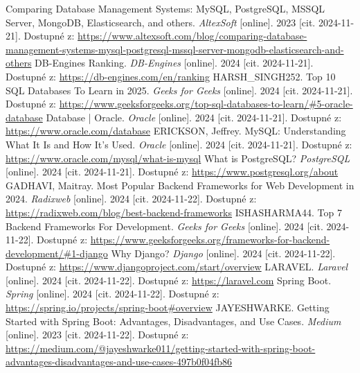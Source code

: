 \documentclass[twoside]{ctuthesis}
\begin{document}
\begin{thebibliography}{1}
Comparing Database Management Systems: MySQL, PostgreSQL, MSSQL Server, MongoDB, Elasticsearch, and others. \emph{AltexSoft} [online]. 2023 [cit. 2024-11-21]. Dostupné z: \url{https://www.altexsoft.com/blog/comparing-database-management-systems-mysql-postgresql-mssql-server-mongodb-elasticsearch-and-others}
DB-Engines Ranking. \emph{DB-Engines} [online]. 2024 [cit. 2024-11-21]. Dostupné z: \url{https://db-engines.com/en/ranking}
HARSH\_SINGH252. Top 10 SQL Databases To Learn in 2025. \emph{Geeks for Geeks} [online]. 2024 [cit. 2024-11-21]. Dostupné z: \url{https://www.geeksforgeeks.org/top-sql-databases-to-learn/\#5-oracle-database}
Database | Oracle. \emph{Oracle} [online]. 2024 [cit. 2024-11-21]. Dostupné z: \url{https://www.oracle.com/database}
ERICKSON, Jeffrey. MySQL: Understanding What It Is and How It’s Used. \emph{Oracle} [online]. 2024 [cit. 2024-11-21]. Dostupné z: \url{https://www.oracle.com/mysql/what-is-mysql}
What is PostgreSQL? \emph{PostgreSQL} [online]. 2024 [cit. 2024-11-21]. Dostupné z: \url{https://www.postgresql.org/about}
GADHAVI, Maitray. Most Popular Backend Frameworks for Web Development in 2024. \emph{Radixweb} [online]. 2024 [cit. 2024-11-22]. Dostupné z: \url{https://radixweb.com/blog/best-backend-frameworks}
ISHASHARMA44. Top 7 Backend Frameworks For Development. \emph{Geeks for Geeks} [online]. 2024 [cit. 2024-11-22]. Dostupné z: \url{https://www.geeksforgeeks.org/frameworks-for-backend-development/\#1-django}
Why Django? \emph{Django} [online]. 2024 [cit. 2024-11-22]. Dostupné z: \url{https://www.djangoproject.com/start/overview}
LARAVEL. \emph{Laravel} [online]. 2024 [cit. 2024-11-22]. Dostupné z: \url{https://laravel.com}
Spring Boot. \emph{Spring} [online]. 2024 [cit. 2024-11-22]. Dostupné z: \url{https://spring.io/projects/spring-boot\#overview}
JAYESHWARKE. Getting Started with Spring Boot: Advantages, Disadvantages, and Use Cases. \emph{Medium} [online]. 2023 [cit. 2024-11-22]. Dostupné z: \url{https://medium.com/@jayeshwarke011/getting-started-with-spring-boot-advantages-disadvantages-and-use-cases-497b0f04fb86}

\end{thebibliography}
\end{document}

